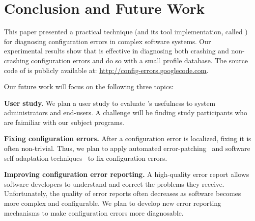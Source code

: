 \section{Conclusion and Future Work}
\vspace{-1mm}

This paper presented a practical technique (and
its tool implementation, called \ourtool) for diagnosing
configuration errors in complex software systems.
Our experimental results show that \ourtool is effective in
diagnosing both crashing and non-crashing configuration errors
and do so with a small profile database.
The source code of \ourtool is publicly available at:
\url{http://config-errors.googlecode.com}.

\vspace{1mm}

Our future
work will focus on the following three topics:

\textbf{User study.} We plan a user study to evaluate
\ourtool's usefulness to system administrators and
end-users. A challenge will be finding study participants
who are faimiliar with our subject programs.

\textbf{Fixing configuration errors.} After a configuration error
is localized, fixing it is
often non-trivial. Thus, we
plan to apply automated error-patching~\cite{rangefix} and
software self-adaptation techniques~\cite{Wang:2009:STR} to
fix configuration errors.


\textbf{Improving configuration error reporting.} A high-quality
error report allows software developers to understand and correct the problems
they receive. 
Unfortunately, the quality of error reports often
decreases as software becomes more complex and configurable.
We plan to develop new error reporting mechanisms
to make configuration errors
more diagnosable.

